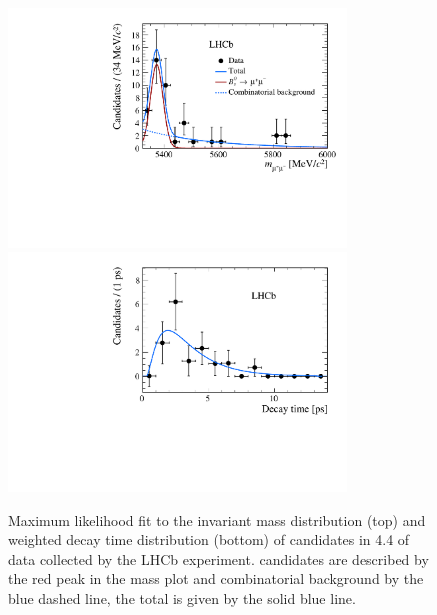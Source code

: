 \begin{figure}[h]
    \centering
          \includegraphics[width= 0.8\textwidth]{./Figs/LifetimeMeasurement/lifetime_mass_results.pdf}
            \includegraphics[width=0.8\textwidth]{./Figs/LifetimeMeasurement/lifetime_results.pdf}

    \caption{Maximum likelihood fit to the invariant mass distribution (top) and weighted decay time distribution (bottom) of \bsmumu candidates in 4.4 \fb of data collected by the LHCb experiment. \bsmumu candidates are described by the red peak in the mass plot and combinatorial background by the blue dashed line, the total \pdf is given by the solid blue line.}
    \label{fig:ELresults}
\end{figure}



